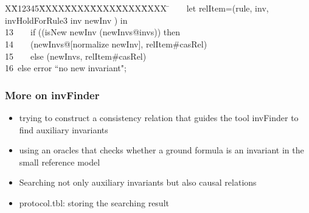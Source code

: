 \documentclass{beamer}
\newlength{\fminilength}
\newenvironment{fmini}[1][\linewidth]
  {\setlength{\fminilength}{#1\fboxsep-2\fboxrule}%
   \vspace{2ex}\noindent\begin{lrbox}{\fminibox}\begin{minipage}{\fminilength}%
   \mbox{ }\hfill\vspace{-2.5ex}}%
  {\end{minipage}\end{lrbox}\vspace{1ex}\hspace{0ex}%
   \framebox{\usebox{\fminibox}}}
\newenvironment{specification}
{\noindent\scriptsize
\tt\begin{fmini}\begin{tabbing}X\=X12345\=XXXX\=XXXX\=XXXX\=XXXX\=XXXX
\=\+\kill} {\end{tabbing}\normalfont\end{fmini}}
\def \twoSpaces {\ \ }
\def \oneSpace {\ }
\def \oneSpace {\ }
\begin{document}
\begin{frame}
\begin{specification}
12\twoSpaces  \twoSpaces     let relItem=(rule, inv,  invHoldForRule3 inv newInv   ) in\\

13\twoSpaces  \twoSpaces   if   ((isNew newInv (newInvs@invs)) then\\
14\twoSpaces  \twoSpaces   (newInvs@[normalize newInv], relItem\#casRel)\\
15\twoSpaces  \twoSpaces   else (newInvs,  relItem\#casRel)\\


16\oneSpace  else  error ``no new invariant";\\
\end{specification}
 \end{frame}


\begin{frame}\frametitle{More on {\sf invFinder}}


\begin{itemize}
\item trying to construct a consistency relation that
guides the tool {\sf invFinder} to find auxiliary invariants

\item using an oracles that checks whether a ground
formula is an invariant in the small reference model


\item Searching not only auxiliary invariants but also causal relations

\item   protocol.tbl:  storing the searching result
\end{itemize}
 \end{frame}
\end{document}

